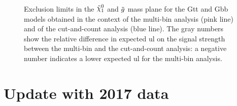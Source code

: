 \begin{figure}[htbp]
	\centering 
	\caption{Exclusion limits in the $\ninoone$ and $\tilde{g}$ mass plane
  		for the  Gtt and   Gbb models obtained
		in the context of the multi-bin analysis (pink line) and of the cut-and-count analysis (blue line). 
		The gray numbers show the relative difference in expected \gls{ul} on the signal strength 
		between the multi-bin and the cut-and-count analysis: a negative number indicates a lower expected \gls{ul} for the multi-bin analysis. }
	\label{fig:limits_GbbGtt_comp}
\end{figure}


\FloatBarrier
\section{Update with 2017 data}
\label{sec:strong:r21}

